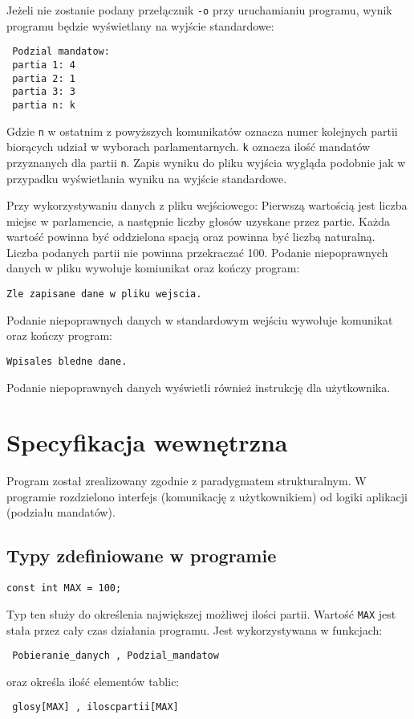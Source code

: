 \documentclass[12pt,a4paper]{article}
\begin{document}
Jeżeli nie zostanie podany przełącznik \texttt{-o} przy uruchamianiu programu, wynik programu będzie wyświetlany na wyjście standardowe:
\begin{verbatim}
 Podzial mandatow:
 partia 1: 4
 partia 2: 1
 partia 3: 3
 partia n: k
\end{verbatim}
Gdzie \texttt{n} w ostatnim z powyższych komunikatów oznacza numer kolejnych partii biorących udział w wyborach parlamentarnych. \texttt{k} oznacza ilość mandatów przyznanych dla partii \texttt{n}. Zapis wyniku do pliku wyjścia wygląda podobnie jak w przypadku wyświetlania wyniku na wyjście standardowe.
\newline

Przy wykorzystywaniu danych z pliku wejściowego:
Pierwszą wartością jest liczba miejsc w parlamencie, a następnie liczby głosów uzyskane przez partie. Każda wartość powinna być oddzielona spacją oraz powinna być liczbą naturalną. Liczba podanych partii nie powinna przekraczać 100. Podanie niepoprawnych danych w pliku wywołuje komiunikat oraz kończy program: 
\begin{verbatim}
Zle zapisane dane w pliku wejscia.
\end{verbatim}
Podanie niepoprawnych danych w standardowym wejściu wywołuje komunikat oraz kończy program: 
\begin{verbatim}
Wpisales bledne dane.
\end{verbatim}
Podanie niepoprawnych danych wyświetli również instrukcję dla użytkownika.
\section{Specyfikacja wewnętrzna}\label{sec:sp-wew}
Program został zrealizowany zgodnie z paradygmatem strukturalnym.  
W programie rozdzielono interfejs (komunikację z użytkownikiem) od logiki aplikacji (podziału mandatów).

\subsection{Typy zdefiniowane w programie}

\begin{lstlisting}
const int MAX = 100;
\end{lstlisting}
Typ ten służy do określenia największej możliwej ilości partii. Wartość \lstinline|MAX| jest stała przez cały czas działania programu. Jest wykorzystywana w funkcjach: \begin{verbatim} Pobieranie_danych , Podzial_mandatow \end{verbatim}
oraz określa ilość elementów tablic: \begin{verbatim} glosy[MAX] , iloscpartii[MAX]\end{verbatim}
\end{document}

